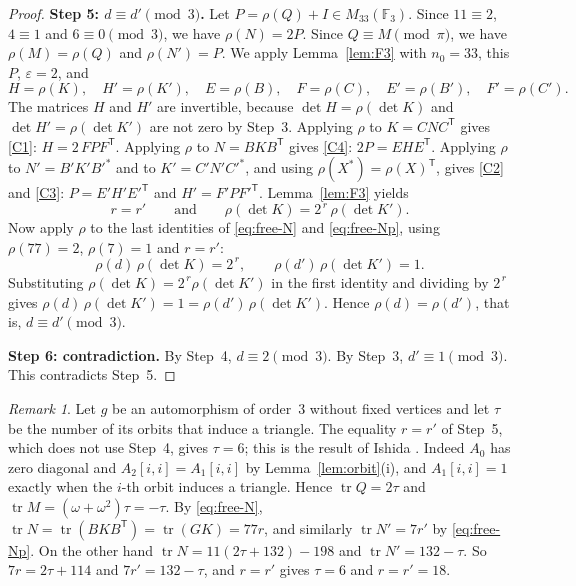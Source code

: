 \documentclass[11pt,a4paper]{article}
\theoremstyle{remark}
\newtheorem{remark}[theorem]{Remark}
\newcommand{\FF}{\mathbb{F}}
\newcommand{\tp}{\mathsf{T}}
\begin{document}
\begin{proof}
\medskip\noindent\textbf{Step 5: $d\equiv d'\pmod3$.}
Let $P=\rho(Q)+I\in M_{33}(\FF_3)$. Since $11\equiv2$, $4\equiv1$ and $6\equiv0\pmod3$, we have $\rho(N)=2P$. Since
$Q\equiv M\pmod\pi$, we have $\rho(M)=\rho(Q)$ and $\rho(N')=P$. We apply Lemma~\ref{lem:F3} with $n_0=33$, this
$P$, $\varepsilon=2$, and
\[
H=\rho(K),\quad H'=\rho(K'),\quad E=\rho(B),\quad F=\rho(C),\quad E'=\rho(B'),\quad F'=\rho(C').
\]
The matrices $H$ and $H'$ are invertible, because $\det H=\rho(\det K)$ and $\det H'=\rho(\det K')$ are not zero by
Step~3. Applying $\rho$ to $K=CNC^{\tp}$ gives \ref{C1}: $H=2\,FPF^{\tp}$. Applying $\rho$ to $N=BKB^{\tp}$ gives
\ref{C4}: $2P=EHE^{\tp}$. Applying $\rho$ to $N'=B'K'B'^*$ and to $K'=C'N'C'^*$, and using
$\rho(X^*)=\rho(X)^{\tp}$, gives \ref{C2} and \ref{C3}: $P=E'H'E'^{\tp}$ and $H'=F'PF'^{\tp}$.
Lemma~\ref{lem:F3} yields
\[
r=r'\qquad\text{and}\qquad\rho(\det K)=2^{\,r}\,\rho(\det K').
\]
Now apply $\rho$ to the last identities of \eqref{eq:free-N} and \eqref{eq:free-Np}, using $\rho(77)=2$,
$\rho(7)=1$ and $r=r'$:
\[
\rho(d)\,\rho(\det K)=2^{\,r},\qquad \rho(d')\,\rho(\det K')=1 .
\]
Substituting $\rho(\det K)=2^{\,r}\rho(\det K')$ in the first identity and dividing by $2^{\,r}$ gives
$\rho(d)\,\rho(\det K')=1=\rho(d')\,\rho(\det K')$. Hence $\rho(d)=\rho(d')$, that is, $d\equiv d'\pmod 3$.

\medskip\noindent\textbf{Step 6: contradiction.}
By Step~4, $d\equiv2\pmod3$. By Step~3, $d'\equiv1\pmod3$. This contradicts Step~5.
\end{proof}

\begin{remark}\label{rem:tau}
Let $g$ be an automorphism of order~3 without fixed vertices and let $\tau$ be the number of its orbits that induce
a triangle. The equality $r=r'$ of Step~5, which does not use Step~4, gives $\tau=6$; this is the result of
Ishida \cite[Proposition~8.7]{I26}. Indeed $A_0$ has zero diagonal and $A_2[i,i]=A_1[i,i]$ by
Lemma~\ref{lem:orbit}(i), and $A_1[i,i]=1$ exactly when the $i$-th orbit induces a triangle. Hence
$\operatorname{tr}Q=2\tau$ and $\operatorname{tr}M=(\omega+\omega^2)\tau=-\tau$. By \eqref{eq:free-N},
$\operatorname{tr}N=\operatorname{tr}(BKB^{\tp})=\operatorname{tr}(GK)=77r$, and similarly
$\operatorname{tr}N'=7r'$ by \eqref{eq:free-Np}. On the other hand
$\operatorname{tr}N=11(2\tau+132)-198$ and $\operatorname{tr}N'=132-\tau$. So $7r=2\tau+114$ and $7r'=132-\tau$,
and $r=r'$ gives $\tau=6$ and $r=r'=18$.
\end{remark}

\end{document}
